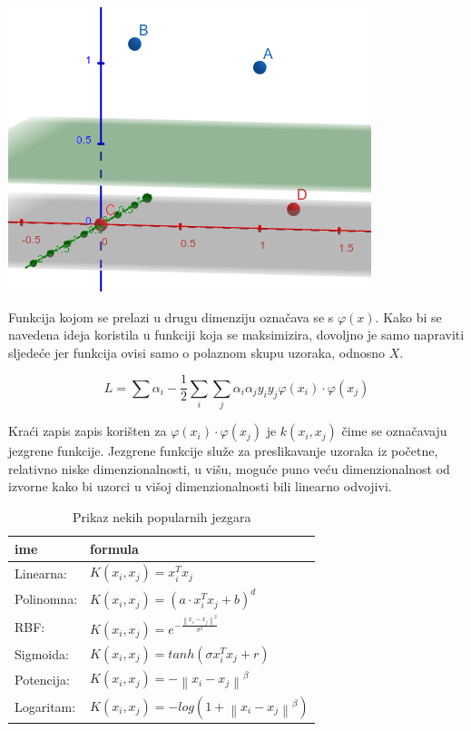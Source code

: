 \documentclass[times, utf8, zavrsni]{fer}
\begin{document}
\begin{multicols}{2}
\begin{minipage}{\linewidth}
\vspace{10pt}
\centering
\includegraphics[width=0.8\linewidth]{img/3d.png}
\end{minipage}
\end{multicols}

Funkcija kojom se prelazi u drugu dimenziju označava se s \(\varphi(x)\). Kako bi se navedena ideja
koristila u funkciji koja se maksimizira, dovoljno je samo napraviti sljedeće
jer funkcija ovisi samo o polaznom skupu uzoraka, odnosno \(X\).

\[
L = \sum \alpha_i - \frac{1}{2} \sum_i \sum_j \alpha_i \alpha_j y_i y_j \varphi(x_i) \cdot \varphi(x_j)
\]

Kraći zapis zapis korišten za \(\varphi(x_i) \cdot \varphi(x_j)\) je \(k(x_i, x_j)\) čime se označavaju 
jezgrene funkcije. Jezgrene funkcije služe za preslikavanje uzoraka iz početne, relativno niske 
dimenzionalnosti, u višu, moguće puno veću dimenzionalnost od izvorne kako bi uzorci u višoj 
dimenzionalnosti bili linearno odvojivi.

\begin{table}[htbp]
\centering
\caption{Prikaz nekih popularnih jezgara}
\begin{tabular}{ll}
\hline
ime & formula \\ \hline
Linearna: & \(K\left( x_i, x_j\right) = x_i^Tx_j\) \\
Polinomna: & \(K\left( x_i, x_j\right) = \left( a \cdot x_i^Tx_j + b\right)^d\)  \\
RBF: & \(K\left( x_i, x_j\right) = e^{-\frac{\left\lVert x_i - x_j \right\rVert^2}{\sigma^2}}\) \\
Sigmoida: & \(K(x_i, x_j) = tanh\left( \sigma x_i^T x_j + r\right)\) \\
Potencija: & \(K\left( x_i, x_j\right) = -\left\lVert x_i - x_j\right\rVert^\beta\) \\
Logaritam: & \(K\left( x_i, x_j\right) = -log\left( 1 + \left\lVert x_i - x_j\right\rVert^\beta\right)\) 
\end{tabular}
\end{table}
\end{document}
